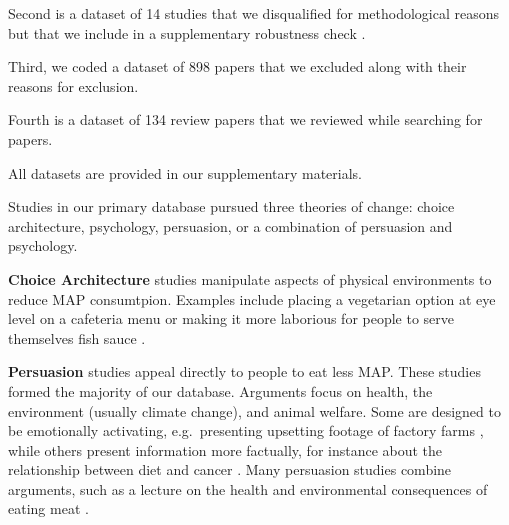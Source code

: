 \documentclass[sn-nature,referee,pdflatex]{sn-jnl}
\begin{document}
Second is a dataset of 14 studies that we disqualified for
methodological reasons but that we include in a supplementary robustness
check
\citep{alblas2023, beresford2006, dannenberg2023, delichatsios2001eatsmart, epperson2021, frie2022, garnett2020, hansen2021, kaiser2020, lentz2020, lindstrom2015, loy2016, piazza2022, reinders2017, vlaeminck2014}.

Third, we coded a dataset of 898 papers that we excluded along with
their reasons for exclusion.

Fourth is a dataset of 134 review papers that we reviewed while
searching for papers.

All datasets are provided in our supplementary materials.

Studies in our primary database pursued three theories of change: choice
architecture, psychology, persuasion, or a combination of persuasion and
psychology.

\textbf{Choice Architecture} studies
\citep{andersson2021, kanchanachitra2020} manipulate aspects of physical
environments to reduce MAP consumtpion. Examples include placing a
vegetarian option at eye level on a cafeteria menu \citep{andersson2021}
or making it more laborious for people to serve themselves fish sauce
\citep{kanchanachitra2020}.

\begin{comment}
Do we put in something here about the line between choice architecture and nudge? I currently have it in the results section
\end{comment}

\textbf{Persuasion} studies
\citep{kanchanachitra2020, abrahamse2007, acharya2004, banerjee2019, bianchi2022, bochmann2017, bschaden2020, carfora2023, hennessy2016, piester2020, cooney2014, cooney2016, feltz2022, haile2021, hatami2018, jalil2023, mathur2021effectiveness, merrill2009, norris2014, peacock2017, polanco2022, sparkman2021, weingarten2022}
appeal directly to people to eat less MAP. These studies formed the
majority of our database. Arguments focus on health, the environment
(usually climate change), and animal welfare. Some are designed to be
emotionally activating, e.g.~presenting upsetting footage of factory
farms \citep{polanco2022}, while others present information more
factually, for instance about the relationship between diet and cancer
\citep{hatami2018}. Many persuasion studies combine arguments, such as a
lecture on the health and environmental consequences of eating meat
\citep{jalil2023}.
\end{document}
